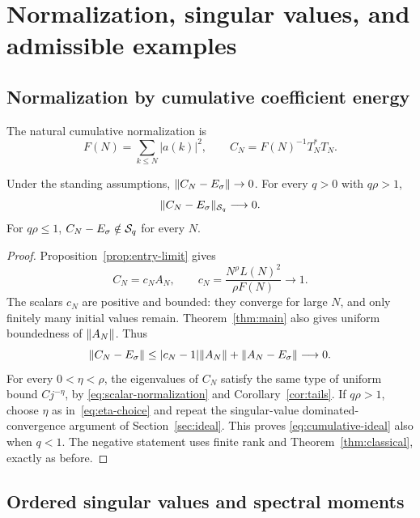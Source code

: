 \section{Normalization, singular values, and admissible examples}
\label{sec:consequences}

\subsection{Normalization by cumulative coefficient energy}

The natural cumulative normalization is
\begin{equation}
 F(N)=\sum_{k\le N}|a(k)|^2,\qquad
 C_N=F(N)^{-1}T_N^*T_N.
 \label{eq:cumulative-normalization}
\end{equation}

\begin{corollary}
\label{cor:cumulative}
Under the standing assumptions,
$\lVert C_N-E_\sigma\rVert\to0$. For every $q>0$ with $q\rho>1$,
\begin{equation}
 \lVert C_N-E_\sigma\rVert_{\mathcal S_q}\longrightarrow0.
 \label{eq:cumulative-ideal}
\end{equation}
For $q\rho\le1$, $C_N-E_\sigma\notin\mathcal S_q$ for every $N$.
\end{corollary}

\begin{proof}
Proposition~\ref{prop:entry-limit} gives
\begin{equation}
 C_N=c_N A_N,\qquad
 c_N=\frac{N^\rho L(N)^2}{\rho F(N)}\longrightarrow1.
 \label{eq:scalar-normalization}
\end{equation}
The scalars $c_N$ are positive and bounded: they converge for large
$N$, and only finitely many initial values remain. Theorem~\ref{thm:main}
also gives uniform boundedness of $\lVert A_N\rVert$. Thus
\[
 \lVert C_N-E_\sigma\rVert
 \le |c_N-1|\lVert A_N\rVert+\lVert A_N-E_\sigma\rVert
 \longrightarrow0.
\]
For every $0<\eta<\rho$, the eigenvalues of $C_N$ satisfy the
same type of uniform bound $C j^{-\eta}$, by
\eqref{eq:scalar-normalization} and Corollary~\ref{cor:tails}.
If $q\rho>1$, choose $\eta$ as in~\eqref{eq:eta-choice} and
repeat the singular-value dominated-convergence argument of
Section~\ref{sec:ideal}. This proves
\eqref{eq:cumulative-ideal} also when $q<1$. The negative statement
uses finite rank and Theorem~\ref{thm:classical}, exactly as before.
\end{proof}

\subsection{Ordered singular values and spectral moments}

